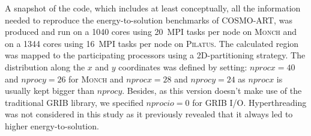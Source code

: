 A snapshot of the code,  which includes at least conceptually, all the
information needed  to reproduce the  energy-to-solution benchmarks of
COSMO-ART, was produced and run on a 1040 cores using 20~MPI tasks per
node on \textsc{Monch} and on a 1344 cores using 16~MPI tasks per node
on  \textsc{Pilatus}.   The  calculated   region  was  mapped  to  the
participating  processors  using   a  2D-partitioning  strategy.   The
distribution along the $x$ and $y$ coordinates was defined by setting:
$nprocx=40$  and $nprocy=26$  for \textsc{Monch}  and  $nprocx=28$ and
$nprocy=24$  as  $nprocx$  is   usually  kept  bigger  than  $nprocy$.
Besides,  as this  version doesn't  make use  of the  traditional GRIB
library, we  specified $nprocio=0$  for GRIB I/O.   Hyperthreading was
not considered in this study  as it previously revealed that it always
led to higher energy-to-solution.



